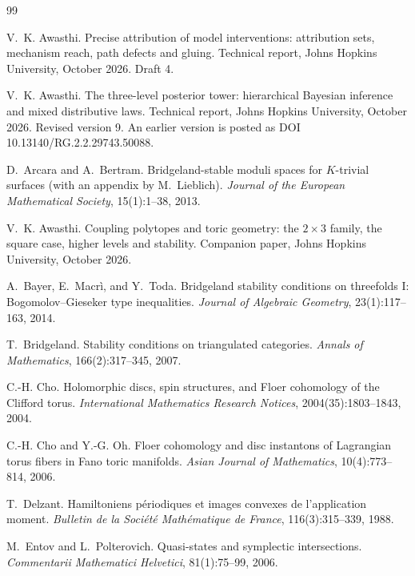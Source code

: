 \documentclass[11pt]{article}
\theoremstyle{definition}
\theoremstyle{remark}
\begin{document}
\begin{thebibliography}{99}

V.~K. Awasthi.
\newblock Precise attribution of model interventions: attribution sets, mechanism reach, path defects
and gluing.
\newblock Technical report, Johns Hopkins University, October 2026. Draft 4.

V.~K. Awasthi.
\newblock The three-level posterior tower: hierarchical {B}ayesian inference and mixed distributive laws.
\newblock Technical report, Johns Hopkins University, October 2026. Revised version 9. An earlier
version is posted as DOI 10.13140/RG.2.2.29743.50088.

D.~Arcara and A.~Bertram.
\newblock Bridgeland-stable moduli spaces for {$K$}-trivial surfaces (with an appendix by M.~Lieblich).
\newblock \emph{Journal of the European Mathematical Society}, 15(1):1--38, 2013.

V.~K. Awasthi.
\newblock Coupling polytopes and toric geometry: the $2\times3$ family, the square case, higher levels and stability.
\newblock Companion paper, Johns Hopkins University, October 2026.

A.~Bayer, E.~Macr\`i, and Y.~Toda.
\newblock Bridgeland stability conditions on threefolds {I}: {B}ogomolov--{G}ieseker type inequalities.
\newblock \emph{Journal of Algebraic Geometry}, 23(1):117--163, 2014.

T.~Bridgeland.
\newblock Stability conditions on triangulated categories.
\newblock \emph{Annals of Mathematics}, 166(2):317--345, 2007.

C.-H. Cho.
\newblock Holomorphic discs, spin structures, and {F}loer cohomology of the {C}lifford torus.
\newblock \emph{International Mathematics Research Notices}, 2004(35):1803--1843, 2004.

C.-H. Cho and Y.-G. Oh.
\newblock Floer cohomology and disc instantons of {L}agrangian torus fibers in {F}ano toric manifolds.
\newblock \emph{Asian Journal of Mathematics}, 10(4):773--814, 2006.

T.~Delzant.
\newblock Hamiltoniens p\'eriodiques et images convexes de l'application moment.
\newblock \emph{Bulletin de la Soci\'et\'e Math\'ematique de France}, 116(3):315--339, 1988.

M.~Entov and L.~Polterovich.
\newblock Quasi-states and symplectic intersections.
\newblock \emph{Commentarii Mathematici Helvetici}, 81(1):75--99, 2006.


\end{thebibliography}
\end{document}
